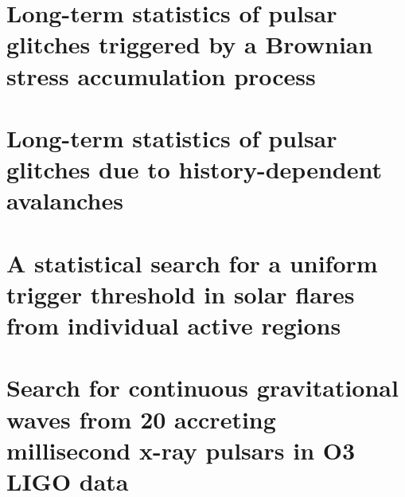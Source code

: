 \documentclass[School=Unimelb]{Dissertate}
\newcommand{\todo}[1]{{\color{red}~\textsf{[{\bf TODO}: #1]}}}
\begin{document}
  \graphicspath{{./figures/}}
  
  \frontmatter

  \linenumbers

  \chapter{Long-term statistics of pulsar glitches triggered by a Brownian stress accumulation process}
  \label{chap:bsa}
  
  
  \chapter{Long-term statistics of pulsar glitches due to history-dependent avalanches}
  \label{chap:hda}
  

  \chapter{A statistical search for a uniform trigger threshold in solar flares from individual active regions}
  \label{chap:sf}
  


  \chapter{Search for continuous gravitational waves from 20 accreting millisecond x-ray pulsars in O3 LIGO data}
  \label{chap:amxp}
  

  \clearpage
  \printbibliography
\end{document}
